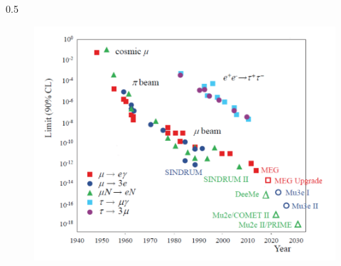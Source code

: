 \documentclass{beamer}
\begin{document}
\begin{frame}
\begin{columns}
\begin{column}{0.5\framewidth}
\begin{figure}[h]
            \includegraphics[width=1.1\columnwidth]{figures/png/Screenshot_20240912_093047.png}
        \end{figure}  
    \end{column}
\end{columns}
\end{frame}



\end{document}
